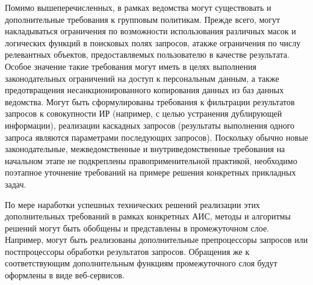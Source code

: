 \begin{multicols}{2}
      Помимо вышеперечисленных, в рамках ве\-домства могут существовать и 
дополнительные требова\-ния к групповым политикам. Прежде всего, могут накладываться 
ограничения по возможности использования различных масок и логических функций в 
поисковых полях запросов, а\linebreak также ограничения по числу релевантных объектов, 
предос\-тав\-ля\-емых пользователю в качестве результата. Особое значение такие требования 
могут иметь в целях выполнения законодательных ограничений на доступ к персональным 
данным, а также предот\-вра\-ще\-ния несанкционированного копирования данных из баз данных 
ведомства. Могут быть сформулированы требования к фильтрации результатов запросов к 
совокупности ИР (например, с целью устранения дублирующей информации), реализации 
каскадных запросов (результаты выполнения одного запроса являются параметрами 
по\-сле\-ду\-ющих запросов). Поскольку обычно новые законодательные, межведомственные и 
внут\-ри\-ведомственные требования на начальном этапе не подкреплены правоприменительной 
практикой, необходимо поэтапное уточнение требований на примере решения конкретных 
прикладных задач. 
      
      По мере наработки успешных технических решений реализации этих дополнительных 
требований в рамках конкретных АИС, методы и алгоритмы решений могут быть обобщены и\linebreak 
представлены в промежуточном слое. Например, могут быть реализованы дополнительные 
препроцессоры запросов или постпроцессоры обработки результатов запросов. Обращения же 
к соответствующим дополнительным функциям промежуточного слоя будут оформлены в 
виде веб-сер\-висов.
\columnbreak
      

\end{multicols}

